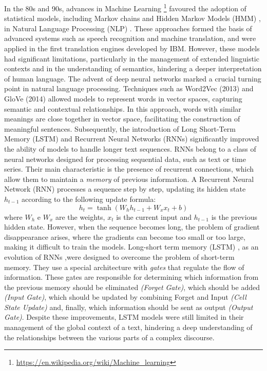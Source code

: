 In the 80s and 90s, advances in Machine Learning \footnote{\url{https://en.wikipedia.org/wiki/Machine_learning}} favoured the adoption of statistical models, including Markov chains and Hidden Markov Models (HMM) \cite{HMM},  in Natural Language Processing (NLP) \cite{NLP}.
These approaches formed the basis of advanced systems such as speech recognition and machine translation, and were applied in the first translation engines developed by IBM. However, these models had significant limitations, particularly in the management of extended linguistic contexts and in the understanding of semantics, hindering a deeper interpretation of human language.
The advent of deep neural networks marked a crucial turning point in natural language processing.
Techniques such as Word2Vec (2013) \cite{Word2vec} and GloVe (2014) \cite{Glove} allowed models to represent words in vector spaces, capturing semantic and contextual relationships. 
In this approach, words with similar meanings are close together in vector space, facilitating the construction of meaningful sentences.
Subsequently, the introduction of Long Short-Term Memory (LSTM) \cite{LSTM} and Recurrent Neural Networks (RNNs) \cite{Rnn} significantly improved the ability of models to handle longer text sequences.
RNNs \cite{Rnn} belong to a class of neural networks designed for processing sequential data, such as text or time series. Their main characteristic is the presence of recurrent connections, which allow them to maintain a \textit{memory} of previous information.
A Recurrent Neural Network (RNN) processes a sequence step by step, updating its hidden state \( h_{t-1} \)  according to the following update formula:\\
\begin{equation}
    h_t = \tanh(W_h h_{t-1} + W_x x_t + b)
\end{equation}
where \( W_h \) e \( W_x \) are the weights, \( x_t \) is the current input and \( h_{t-1} \) is the previous hidden state.
However, when the sequence becomes long, the problem of gradient disappearance \cite{Vanishing} arises, where the gradients can become too small or too large, making it difficult to train the models.
Long-short term memory (LSTM) \cite{LSTM}, as an evolution of RNNs \cite{Rnn},were designed to overcome the problem of short-term memory.
They use a special architecture with \textit{gates} that regulate the flow of information.
These gates are responsible for determining which information from the previous memory should be eliminated \textit{(Forget Gate)},  which should be added \textit{(Input Gate)}, which should be updated by combining Forget and Input \textit{(Cell State Update)} and, finally, which information should be sent as output \textit{(Output Gate)}.
Despite these improvements, LSTM models were still limited in their management of the global context of a text, hindering a deep understanding of the relationships between the various parts of a complex discourse.
